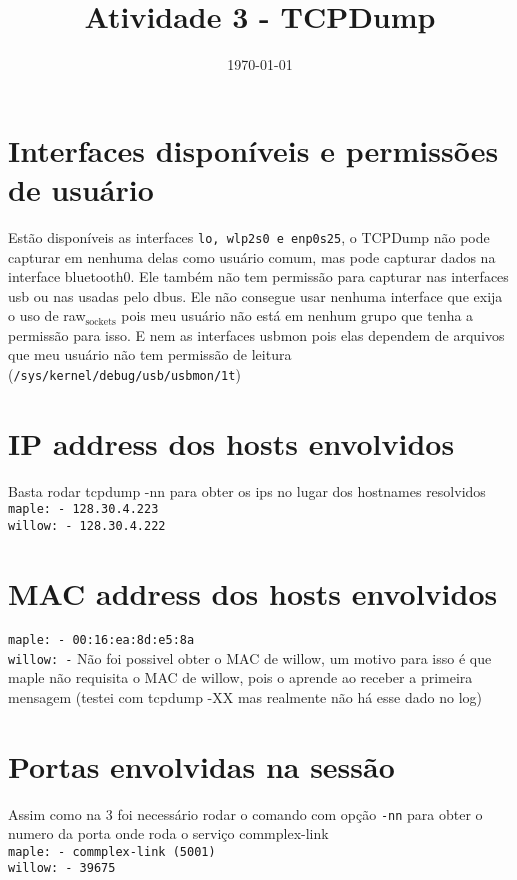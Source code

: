\documentclass[11pt]{article}
\date{\today}
\title{Atividade 3 - TCPDump}
\begin{document}
\maketitle
\tableofcontents

\section{Interfaces disponíveis e permissões de usuário}
\label{sec-1}
Estão disponíveis as interfaces \texttt{lo, wlp2s0 e enp0s25}, o TCPDump não 
pode capturar em nenhuma delas como usuário comum, mas pode capturar 
dados na interface bluetooth0.
Ele também não tem permissão para capturar nas interfaces usb ou
nas usadas pelo dbus.
Ele não consegue usar nenhuma interface que exija o uso de
raw$_{\text{sockets}}$ pois meu usuário não está em nenhum grupo que tenha a
permissão para isso. E nem as interfaces usbmon pois elas dependem
de arquivos que meu usuário não tem permissão de leitura
(\texttt{/sys/kernel/debug/usb/usbmon/1t})

\section{IP address dos hosts envolvidos}
\label{sec-2}
Basta rodar tcpdump -nn para obter os ips no lugar dos hostnames
resolvidos\\
\texttt{maple:  - 128.30.4.223}\\
\texttt{willow: - 128.30.4.222}

\section{MAC address dos hosts envolvidos}
\label{sec-3}
\texttt{maple:  - 00:16:ea:8d:e5:8a}\\
\texttt{willow: -} Não foi possivel obter o MAC de willow, um motivo para isso é
que maple não requisita o MAC de willow, pois o aprende ao receber a
primeira mensagem (testei com tcpdump -XX mas realmente não há esse dado
no log)

\section{Portas envolvidas na sessão}
\label{sec-4}
Assim como na 3 foi necessário rodar o comando com opção \texttt{-nn} para
obter o numero da porta onde roda o serviço commplex-link\\
\texttt{maple:  - commplex-link (5001)}\\
\texttt{willow: - 39675}
\end{document}
